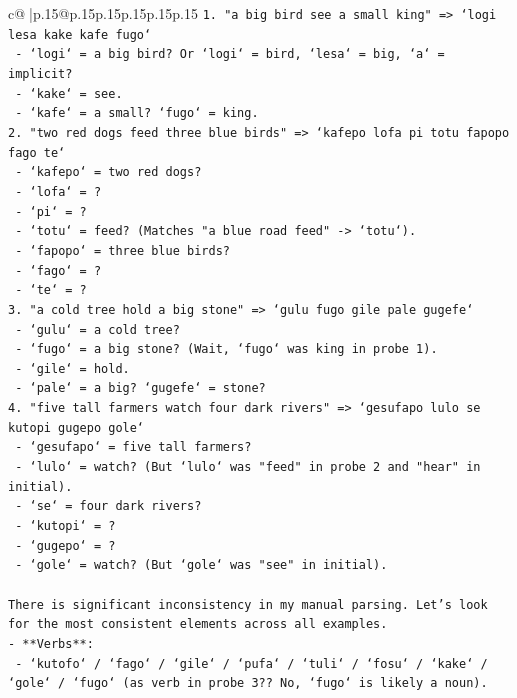 \documentclass{article}
\begin{document}
{\begin{supertabular}{c@{$\;$}|p{.15\linewidth}@{}p{.15\linewidth}p{.15\linewidth}p{.15\linewidth}p{.15\linewidth}p{.15\linewidth}}
{{{\texttt{1. "a big bird see a small king" => `logi lesa kake kafe fugo`} \\
\texttt{   {-} `logi` = a big bird? Or `logi` = bird, `lesa` = big, `a` = implicit?} \\
\texttt{   {-} `kake` = see.} \\
\texttt{   {-} `kafe` = a small? `fugo` = king.} \\
\texttt{2. "two red dogs feed three blue birds" => `kafepo lofa pi totu fapopo fago te`} \\
\texttt{   {-} `kafepo` = two red dogs?} \\
\texttt{   {-} `lofa` = ?} \\
\texttt{   {-} `pi` = ?} \\
\texttt{   {-} `totu` = feed? (Matches "a blue road feed" {-}> `totu`).} \\
\texttt{   {-} `fapopo` = three blue birds?} \\
\texttt{   {-} `fago` = ?} \\
\texttt{   {-} `te` = ?} \\
\texttt{3. "a cold tree hold a big stone" => `gulu fugo gile pale gugefe`} \\
\texttt{   {-} `gulu` = a cold tree?} \\
\texttt{   {-} `fugo` = a big stone? (Wait, `fugo` was king in probe 1).} \\
\texttt{   {-} `gile` = hold.} \\
\texttt{   {-} `pale` = a big? `gugefe` = stone?} \\
\texttt{4. "five tall farmers watch four dark rivers" => `gesufapo lulo se kutopi gugepo gole`} \\
\texttt{   {-} `gesufapo` = five tall farmers?} \\
\texttt{   {-} `lulo` = watch? (But `lulo` was "feed" in probe 2 and "hear" in initial).} \\
\texttt{   {-} `se` = four dark rivers?} \\
\texttt{   {-} `kutopi` = ?} \\
\texttt{   {-} `gugepo` = ?} \\
\texttt{   {-} `gole` = watch? (But `gole` was "see" in initial).} \\
\\ 
\texttt{There is significant inconsistency in my manual parsing. Let's look for the most consistent elements across all examples.} \\
\texttt{{-} **Verbs**:} \\
\texttt{  {-} `kutofo` / `fago` / `gile` / `pufa` / `tuli` / `fosu` / `kake` / `gole` / `fugo` (as verb in probe 3?? No, `fugo` is likely a noun).} \\
}}}
\end{supertabular}}
\end{document}
